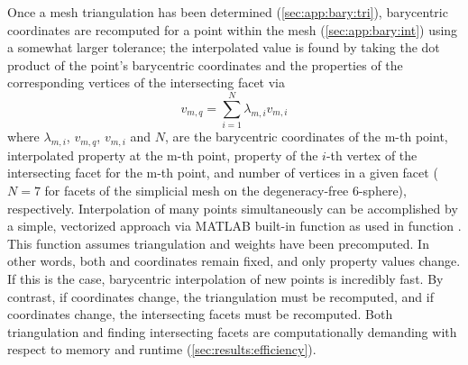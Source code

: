 \documentclass[final,twocolumn,12pt]{elsarticle}
\begin{document}
\begin{appendices}
Once a mesh triangulation has been determined (\cref{sec:app:bary:tri}), barycentric coordinates are recomputed for a \outpt{} point within the \inpt{} mesh (\cref{sec:app:bary:int}) using a somewhat larger tolerance; the interpolated value is found by taking the dot product of the \outpt{} point's barycentric coordinates and the properties of the corresponding vertices of the intersecting facet via
\begin{equation}
\label{eq:bary-interp}
v_{m,q}=\underset{i=1}{\overset{N}{\sum }}\lambda _{m,i} v_{m,i}
\end{equation}
where $\lambda_{m,i}$, $v_{m,q}$, $v_{m,i}$ and $N$, are the barycentric coordinates of the m-th \outpt{} point, interpolated property at the m-th \outpt{} point, property of the $i$-th vertex of the intersecting facet for the m-th \outpt{} point, and number of vertices in a given facet ($N = 7$ for facets of the simplicial mesh on the degeneracy-free 6-sphere), respectively. Interpolation of many \outpt{} points simultaneously can be accomplished by a simple, vectorized approach via MATLAB built-in function  as used in \vfzorepo{} function . This function assumes triangulation and weights have been precomputed. In other words, both \inpt{} and \outpt{} coordinates remain fixed, and only \inpt{} property values change. If this is the case, barycentric interpolation of new points is incredibly fast. By contrast, if \inpt{} coordinates change, the triangulation must be recomputed, and if \outpt{} coordinates change, the intersecting facets must be recomputed. Both triangulation and finding intersecting facets are computationally demanding with respect to memory and runtime (\cref{sec:results:efficiency}).

\end{appendices}

\printglossaries




% 
\end{document}

